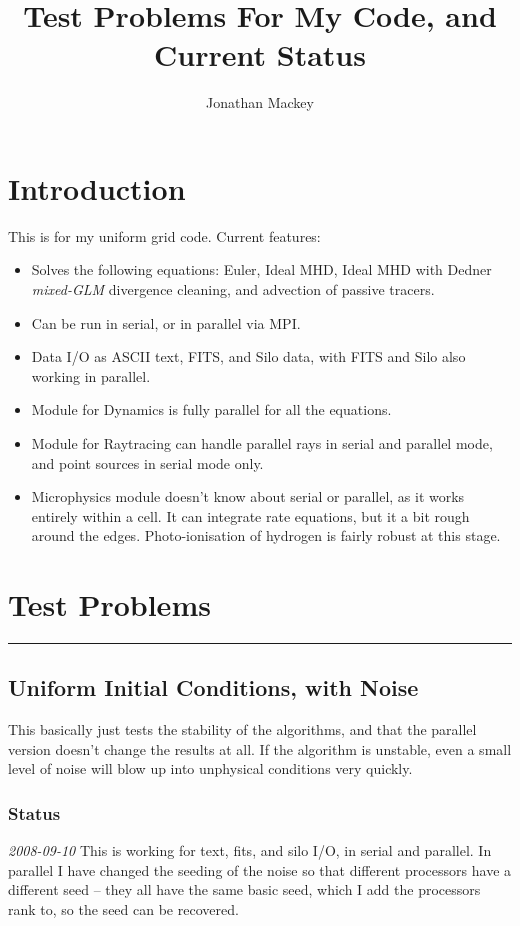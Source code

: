 \documentclass[11pt]{article}
\begin{document}
\title{Test Problems For My Code, and Current Status}
\author{Jonathan Mackey}
\maketitle

\section{Introduction}
This is for my uniform grid code.  Current features:
\begin{itemize}
\item Solves the following equations: Euler, Ideal MHD, Ideal MHD with
Dedner \textit{mixed-GLM} divergence cleaning, and advection of
passive tracers.
\item Can be run in serial, or in parallel via MPI.
\item Data I/O as ASCII text, FITS, and Silo data, with FITS and Silo
also working in parallel.
\item Module for Dynamics is fully parallel for all the equations.
\item Module for Raytracing can handle parallel rays in serial and
parallel mode, and point sources in serial mode only.
\item Microphysics module doesn't know about serial or parallel, as it
works entirely within a cell.  It can integrate rate equations, but it
a bit rough around the edges.  Photo-ionisation of hydrogen is fairly
robust at this stage.
\end{itemize}

\section{Test Problems}
\vspace{0.4cm} \hrule
\subsection{Uniform Initial Conditions, with Noise}
This basically just tests the stability of the algorithms, and that
the parallel version doesn't change the results at all.  If the
algorithm is unstable, even a small level of noise will blow up into
unphysical conditions very quickly.
\subsubsection{Status}
\textit{2008-09-10} This is working for text, fits, and silo I/O, in
serial and parallel.  In parallel I have changed the seeding of the
noise so that different processors have a different seed -- they all
have the same basic seed, which I add the processors rank to, so the
seed can be recovered.
\end{document}
